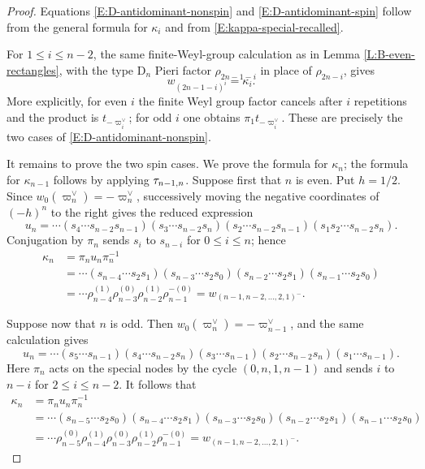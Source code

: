 \documentclass[a4paper]{amsart}
\theoremstyle{remark}
\numberwithin{equation}{section}
\begin{document}
{\begin{proof}
Equations \eqref{E:D-antidominant-nonspin} and
\eqref{E:D-antidominant-spin} follow from the general formula for
$\kappa_i$ and from \eqref{E:kappa-special-recalled}.

For $1\leq i\leq n-2$, the same finite-Weyl-group calculation as in Lemma
\ref{L:B-even-rectangles}, with the type $\mathrm{D}_n$ Pieri factor
$\rho_{2n-1-i}$ in place of $\rho_{2n-i}$, gives
\[
  w_{(2n-1-i)^i}=\kappa_i.
\]
More explicitly, for even $i$ the finite Weyl group factor cancels after
$i$ repetitions and the product is $t_{-\varpi_i^\lor}$; for odd $i$ one
obtains $\pi_1t_{-\varpi_i^\lor}$.  These are precisely the two cases of
\eqref{E:D-antidominant-nonspin}.

It remains to prove the two spin cases.  We prove the formula for $\kappa_n$;
the formula for $\kappa_{n-1}$ follows by applying $\tau_{n-1,n}$.  Suppose first
that $n$ is even.  Put $h=1/2$.  Since
$w_0(\varpi_n^\lor)=-\varpi_n^\lor$, successively moving the negative
coordinates of $(-h)^n$ to the right gives the reduced expression
\begin{equation}
\label{E:un-even}
  u_n=\dotsm
  (s_4\dotsm s_{n-2}s_{n-1})
  (s_3\dotsm s_{n-2}s_n)
  (s_2\dotsm s_{n-2}s_{n-1})
  (s_1s_2\dotsm s_{n-2}s_n).
\end{equation}
Conjugation by $\pi_n$ sends $s_i$ to $s_{n-i}$ for $0\leq i\leq n$;
hence
\begin{align*}
  \kappa_n
  &=\pi_nu_n\pi_n^{-1} \\
  &=\dotsm
    (s_{n-4}\dotsm s_2s_1)
    (s_{n-3}\dotsm s_2s_0)
    (s_{n-2}\dotsm s_2s_1)
    (s_{n-1}\dotsm s_2s_0) \\
  &=\dotsm
    \rho_{n-4}^{(1)}\rho_{n-3}^{(0)}
    \rho_{n-2}^{(1)}\rho_{n-1}^{-(0)}
   =w_{(n-1,n-2,\ldots,2,1)^-}.
\end{align*}

Suppose now that $n$ is odd.  Then
$w_0(\varpi_n^\lor)=-\varpi_{n-1}^\lor$, and the same calculation gives
\begin{equation}
\label{E:un-odd}
  u_n=\dotsm
  (s_5\dotsm s_{n-1})
  (s_4\dotsm s_{n-2}s_n)
  (s_3\dotsm s_{n-1})
  (s_2\dotsm s_{n-2}s_n)
  (s_1\dotsm s_{n-1}).
\end{equation}
Here $\pi_n$ acts on the special nodes by the cycle $(0,n,1,n-1)$ and
sends $i$ to $n-i$ for $2\leq i\leq n-2$.  It follows that
\begin{align*}
  \kappa_n
  &=\pi_nu_n\pi_n^{-1} \\
  &=\dotsm
    (s_{n-5}\dotsm s_2s_0)
    (s_{n-4}\dotsm s_2s_1)
    (s_{n-3}\dotsm s_2s_0)
    (s_{n-2}\dotsm s_2s_1)
    (s_{n-1}\dotsm s_2s_0) \\
  &=\dotsm
    \rho_{n-5}^{(0)}\rho_{n-4}^{(1)}
    \rho_{n-3}^{(0)}\rho_{n-2}^{(1)}\rho_{n-1}^{-(0)}
   =w_{(n-1,n-2,\ldots,2,1)^-}.
\end{align*}
\end{proof}

}
\end{document}
